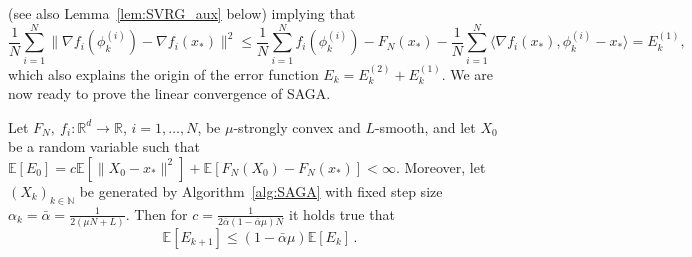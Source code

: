 \documentclass[12pt,openany]{book}
\theoremstyle{definition}
\theoremstyle{definition}
\newcommand{\E}{\mathbb{E}}
\newcommand{\N}{\mathbb{N}}
\newcommand{\R}{\mathbb{R}}
\begin{document}
(see also Lemma~\ref{lem:SVRG_aux} below) implying that
\[\frac1N\sum_{i=1}^N\|\nabla f_i(\phi_k^{(i)})-\nabla f_i(x_\ast)\|^2\le \frac1N\sum_{i=1}^N f_i(\phi_k^{(i)})-F_N(x_\ast) -\frac1N\sum_{i=1}^N \langle \nabla f_i(x_\ast),\phi_k^{(i)}-x_\ast\rangle =E_k^{(1)},\]
which also explains the origin of the error function $E_k = E_k^{(2)}+E_k^{(1)}$. We are now ready to prove the linear convergence of SAGA.
\begin{thm}\label{thm:SAGA}
Let $F_N,\ f_i:\R^d\to\R$, $i=1,\dots,N$, be $\mu$-strongly convex and $L$-smooth, and let $X_0$ be a random variable such that $\E[E_0] = c\E[\|X_0-x_\ast\|^2] + \E[F_N(X_0)-F_N(x_\ast)]<\infty$. Moreover, let $(X_k)_{k\in\N}$ be generated by Algorithm~\ref{alg:SAGA} with fixed step size $\alpha_k =\bar\alpha = \frac{1}{2(\mu N+L)}$. Then for $c=\frac{1}{2\bar\alpha (1-\bar\alpha\mu)N}$ it holds true that
\[\E[E_{k+1}] \le (1-\bar\alpha\mu)\E[E_k]\,. \]
\end{thm}
\end{document}
